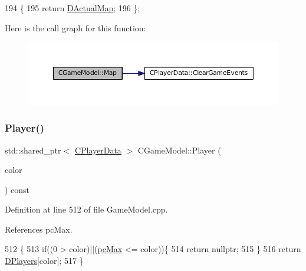 \begin{DoxyCode}
194                                                        \{
195             \textcolor{keywordflow}{return} \hyperlink{classCGameModel_ace04c3b62d6b71e20d1ed5460c0c3cee}{DActualMap};  
196         \};
\end{DoxyCode}
Here is the call graph for this function\+:\nopagebreak
\begin{figure}[H]
\begin{center}
\leavevmode
\includegraphics[width=350pt]{classCGameModel_a7b95d8fb5d96d3dd9ad3596e1a90f6a3_cgraph}
\end{center}
\end{figure}
\hypertarget{classCGameModel_ad9c8def41d5369661fab971b9a4fe786}{}\label{classCGameModel_ad9c8def41d5369661fab971b9a4fe786} 
\subsubsection{\texorpdfstring{Player()}{Player()}}
{\footnotesize\ttfamily std\+::shared\+\_\+ptr$<$ \hyperlink{classCPlayerData}{C\+Player\+Data} $>$ C\+Game\+Model\+::\+Player (\begin{DoxyParamCaption}\item[{\hyperlink{GameDataTypes_8h_aafb0ca75933357ff28a6d7efbdd7602f}{E\+Player\+Color}}]{color }\end{DoxyParamCaption}) const}



Definition at line 512 of file Game\+Model.\+cpp.



References pc\+Max.


\begin{DoxyCode}
512                                                                        \{
513     \textcolor{keywordflow}{if}((0 > color)||(\hyperlink{GameDataTypes_8h_aafb0ca75933357ff28a6d7efbdd7602fa594a5c8dd3987f24e8a0f23f1a72cd34}{pcMax} <= color))\{
514         \textcolor{keywordflow}{return} \textcolor{keyword}{nullptr};   
515     \}
516     \textcolor{keywordflow}{return} \hyperlink{classCGameModel_a524436c3560b10e1c6d6fdd0b66565dc}{DPlayers}[color];
517 \}
\end{DoxyCode}
\hypertarget{classCGameModel_a699325d41d7ff27bda47bfb3048cfd8f}{}\label{classCGameModel_a699325d41d7ff27bda47bfb3048cfd8f} 
